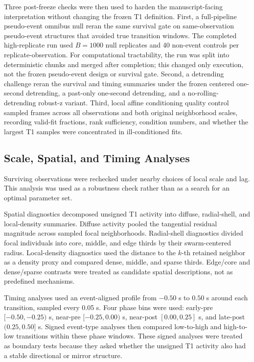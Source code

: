Three post-freeze checks were then used to harden the manuscript-facing
interpretation without changing the frozen T1 definition. First, a
full-pipeline pseudo-event omnibus null reran the same survival gate on
same-observation pseudo-event structures that avoided true transition windows.
The completed high-replicate run used $B=1000$ null replicates and 40
non-event controls per replicate-observation. For computational tractability,
the run was split into deterministic chunks and merged after completion; this
changed only execution, not the frozen pseudo-event design or survival gate.
Second, a detrending challenge reran the survival and timing summaries under
the frozen centered one-second detrending, a past-only one-second detrending,
and a no-rolling-detrending robust-z variant. Third, local affine conditioning
quality control sampled frames across all observations and both original
neighborhood scales, recording valid-fit fractions, rank sufficiency,
condition numbers, and whether the largest T1 samples were concentrated in
ill-conditioned fits.

\subsection{Scale, Spatial, and Timing Analyses}

Surviving observations were rechecked under nearby choices of local scale and
lag. This analysis was used as a robustness check rather than as a search for
an optimal parameter set.

Spatial diagnostics decomposed unsigned T1 activity into diffuse,
radial-shell, and local-density summaries. Diffuse activity pooled the
tangential residual magnitude across sampled focal neighborhoods. Radial-shell
diagnostics divided focal individuals into core, middle, and edge thirds by
their swarm-centered radius. Local-density diagnostics used the distance to
the $k$-th retained neighbor as a density proxy and compared dense, middle,
and sparse thirds. Edge/core and dense/sparse contrasts were treated as
candidate spatial descriptions, not as predefined mechanisms.

Timing analyses used an event-aligned profile from $-0.50$ s to $0.50$ s
around each transition, sampled every 0.05 s. Four phase bins were used:
early-pre $[-0.50,-0.25)$ s, near-pre $[-0.25,0.00)$ s, near-post
$[0.00,0.25]$ s, and late-post $(0.25,0.50]$ s. Signed event-type analyses
then compared low-to-high and high-to-low transitions within these phase
windows. These signed analyses were treated as boundary tests because they
asked whether the unsigned T1 activity also had a stable directional or mirror
structure.
